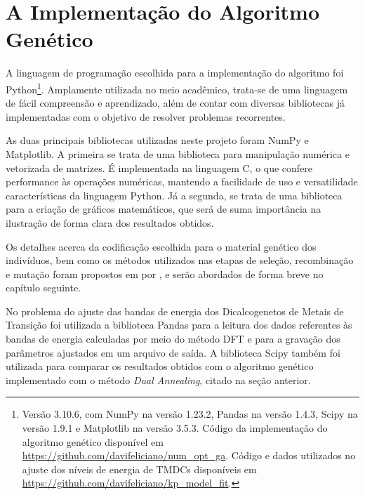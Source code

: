 \section{A Implementação do Algoritmo Genético}

A linguagem de programação escolhida para a implementação do algoritmo foi Python\footnote{
  Versão 3.10.6, com NumPy na versão 1.23.2, Pandas na versão 1.4.3, Scipy na versão 1.9.1 e Matplotlib na versão 3.5.3.
  Código da implementação do algoritmo genético disponível em \url{https://github.com/davifeliciano/num_opt_ga}.
  Código e dados utilizados no ajuste dos níveis de energia de TMDCs disponíveis em \url{https://github.com/davifeliciano/kp_model_fit}.
}. Amplamente utilizada no meio 
acadêmico, trata-se de uma linguagem de fácil compreensão e aprendizado, além de contar com diversas bibliotecas
já implementadas com o objetivo de resolver problemas recorrentes.

As duas principais bibliotecas utilizadas neste projeto foram NumPy \cite{numpy2020} e Matplotlib. 
A primeira se trata de uma biblioteca para manipulação numérica e vetorizada de matrizes. É implementada na linguagem C, 
o que confere performance às operações numéricas, mantendo a facilidade de uso e versatilidade características da linguagem
Python. Já a segunda, se trata de uma biblioteca para a criação de gráficos matemáticos, que será de suma importância
na ilustração de forma clara dos resultados obtidos.

Os detalhes acerca da codificação escolhida para o material genético dos indivíduos, bem como os métodos utilizados
nas etapas de seleção, recombinação e mutação foram propostos em \citeyear{roncaratti2006ga} por \citeauthor{roncaratti2006ga},
e serão abordados de forma breve no capítulo seguinte.

No problema do ajuste das bandas de energia dos Dicalcogenetos de Metais de
Transição foi utilizada a biblioteca Pandas para a leitura dos dados
referentes às bandas de energia calculadas por meio do método DFT e para a
gravação dos parâmetros ajustados em um arquivo de saída. A biblioteca Scipy \cite{scipy2020}
também foi utilizada para comparar os resultados obtidos com o algoritmo
genético implementado com o método \textit{Dual Annealing}, citado na seção anterior.